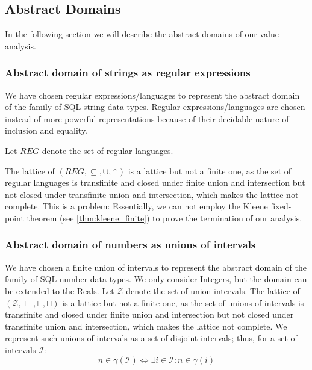 \subsection{Abstract Domains}\label{subsec:abstract-domains}

In the following section we will describe the abstract domains of our value analysis.

\subsubsection{Abstract domain of strings as regular expressions}\label{subsubsec:abstract_domains_strings}
We have chosen regular expressions/languages to represent the abstract domain of the family of SQL string data types.
Regular expressions/languages are chosen instead of more powerful representations because of their decidable nature of inclusion and equality.

Let $REG$ denote the set of regular languages. %

The lattice of $(REG, \subseteq, \cup, \cap)$ is a lattice but not a finite one, as the set of regular languages is transfinite and closed under finite union and intersection but not closed under transfinite union and intersection, which makes the lattice not complete.
This is a problem: Essentially, we can not employ the Kleene fixed-point theorem (see \autoref{thm:kleene_finite}) to prove the termination of our analysis.

\subsubsection{Abstract domain of numbers as unions of intervals}\label{subsubsec:abstract_domains_numbers}
We have chosen a finite union of intervals to represent the abstract domain of the family of SQL number data types.
We only consider Integers, but the domain can be extended to the Reals.
Let $\mathscr{Z}$ denote the set of union intervals.
The lattice of $(\mathscr{Z}, \sqsubseteq, \sqcup, \sqcap)$ is a lattice but not a finite one, as the set of unions of intervals is transfinite and closed under finite union and intersection but not closed under transfinite union and intersection, which makes the lattice not complete.
We represent such unions of intervals as a set of disjoint intervals; thus, for a set of intervals $\mathscr{I}$:
\begin{equation}
    n \in \gamma(\mathscr{I}) \iff \exists i \in \mathscr{I} : n \in \gamma(i)
\end{equation}


